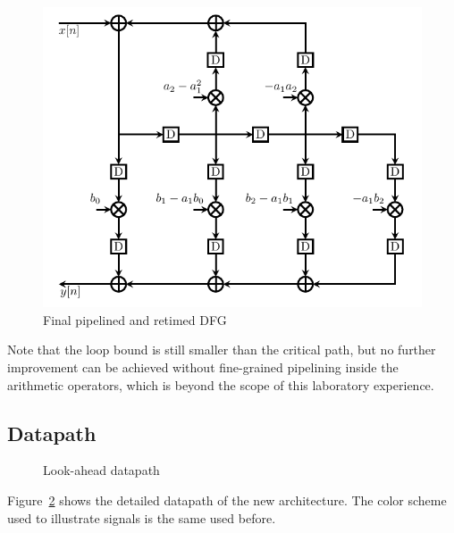 \documentclass[a4paper]{article}
\begin{document}
\begin{figure}[hbtp]
    \centering
    \includegraphics[width=.9\linewidth]{media/pipelined_lookahead_dfg.pdf}
    \caption{Final pipelined and retimed DFG}
    \label{fig:pipelined_dfg}
\end{figure}

Note that the loop bound is still smaller than the critical path, but no further improvement can be achieved without fine-grained pipelining inside the arithmetic operators, which is beyond the scope of this laboratory experience.

\subsection{Datapath}
\begin{figure}[hbtp]
    \centering
    \caption{Look-ahead datapath}
    \label{fig:pipelined_dp}
\end{figure}
Figure~\ref{fig:pipelined_dp} shows the detailed datapath of the new architecture. The color scheme used to illustrate signals is the same used before.
\end{document}
